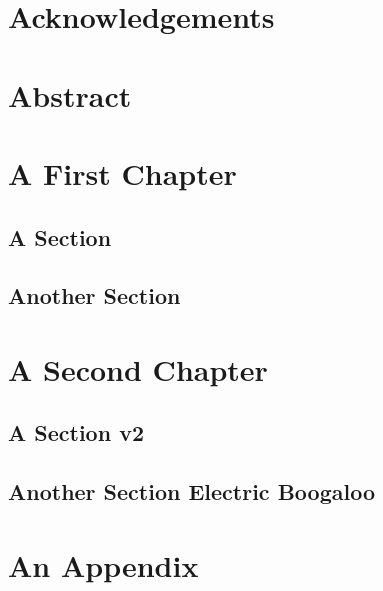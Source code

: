 \documentclass[a4paper, twoside]{report}
\begin{document}
\chapter*{Acknowledgements}

    \lipsum[1]

\clearpage

{ \hypersetup{hidelinks} \tableofcontents {} }

\setcounter{page}{1}
\chapter*{Abstract}
\label{chap:abstract}
    \lipsum[1-2]

\chapter{A First Chapter}

    \lipsum[1]
    \section{A Section}
        \lipsum
    \section{Another Section}
        \lipsum

\chapter{A Second Chapter}

    \lipsum[1]
    \section{A Section v2}
        \lipsum
    \section{Another Section Electric Boogaloo}
        \lipsum






\appendix
\appendixpage
\addappheadtotoc

\chapter{An Appendix}
\end{document}
